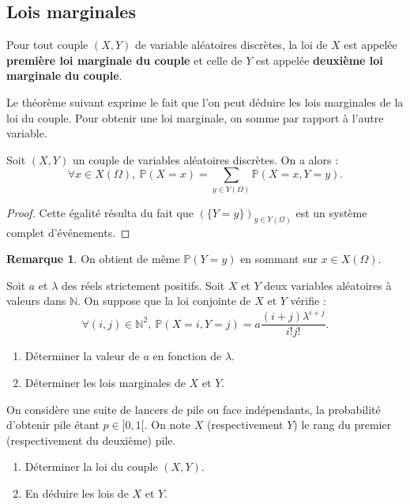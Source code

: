 \documentclass[french]{article}
\renewcommand{\P}{\mathbb{P}}
\newcommand{\N}{\mathbb{N}}
\theoremstyle{plain}
\theoremstyle{definition}
\newtheorem*{rmq}{Remarque}
\theoremstyle{remark}
\begin{document}
\subsection{Lois marginales}

\begin{dfn}
	Pour tout couple $(X,Y)$ de variable aléatoires discrètes, la loi de $X$ est appelée \textbf{première loi marginale du couple} et celle de $Y$ est appelée \textbf{deuxième loi marginale du couple}.
\end{dfn}

Le théorème suivant exprime le fait que l'on peut déduire les lois marginales de la loi du couple. Pour obtenir une loi marginale, on somme par rapport à l'autre variable.

\begin{thm}%
	Soit $(X,Y)$ un couple de variables aléatoires discrètes. On a alors :
	$$\forall x\in X(\Omega),\ \P(X=x)=\sum_{y\in Y(\Omega)}\P(X=x,Y=y).$$
\end{thm}
\begin{proof}
	Cette égalité résulta du fait que $(\{Y=y\})_{y\in Y(\Omega)}$ est un système complet d'événements.
\end{proof}

\begin{rmq}
	On obtient de même $\P(Y=y)$ en sommant sur $x\in X(\Omega)$.
\end{rmq}

\begin{exo}
	Soit $a$ et $\lambda$ des réels strictement positifs. Soit $X$ et $Y$ deux variables aléatoires à valeurs dans $\N$. On suppose que la loi conjointe de $X$ et $Y$ vérifie :
	$$\forall (i,j)\in\N^2,\ \P(X=i,Y=j)=a\frac{(i+j)\lambda^{i+j}}{i!j!}.$$
	\begin{enumerate}
		\item Déterminer la valeur de $a$ en fonction de $\lambda$.
		\item Déterminer les lois marginales de $X$ et $Y$.
	\end{enumerate}
\end{exo}

\begin{exo}
	On considère une suite de lancers de pile ou face indépendants, la probabilité d'obtenir pile étant $p\in]0,1[$. On note $X$ (respectivement $Y$) le rang du premier (respectivement du deuxième) pile.
	\begin{enumerate}
		\item Déterminer la loi du couple $(X,Y)$.
		\item En déduire les lois de $X$ et $Y$.
	\end{enumerate}
\end{exo}
\end{document}
